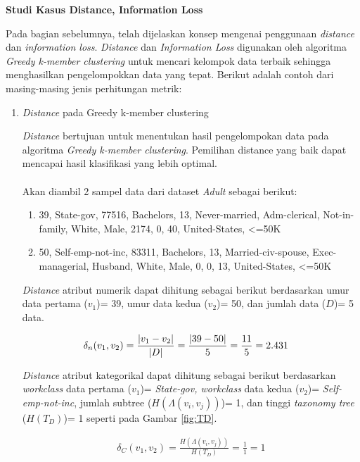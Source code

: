 \documentclass[a4paper,twoside]{article}
\begin{document}
\begin{enumerate}
\textbf{Studi Kasus Distance, Information Loss}

Pada bagian sebelumnya, telah dijelaskan konsep mengenai penggunaan \textit{distance} dan \textit{information loss}. \textit{Distance} dan \textit{Information Loss} digunakan oleh algoritma \textit{Greedy k-member clustering} untuk mencari kelompok data terbaik sehingga menghasilkan pengelompokkan data yang tepat. Berikut adalah contoh dari masing-masing jenis perhitungan metrik:

\begin{enumerate}

\item \textit{Distance} pada Greedy k-member clustering

\textit{Distance} bertujuan untuk menentukan hasil pengelompokan data pada algoritma \textit{Greedy k-member clustering}. Pemilihan distance yang baik dapat mencapai hasil klasifikasi yang lebih optimal.
\\\\
\noindent Akan diambil 2 sampel data dari dataset \textit{Adult} sebagai berikut:
\begin{enumerate}
\item 39, State-gov, 77516, Bachelors, 13, Never-married, Adm-clerical, Not-in-family, White, Male, 2174, 0, 40, United-States, <=50K
\item 50, Self-emp-not-inc, 83311, Bachelors, 13, Married-civ-spouse, Exec-managerial, Husband, White, Male, 0, 0, 13, United-States, <=50K
\end{enumerate}

\noindent \textit{Distance} atribut numerik dapat dihitung sebagai berikut berdasarkan umur data pertama ($v_1$)= 39, umur data kedua ($v_2$)= 50, dan jumlah data ($D$)= 5 data.


\begin{align*}
\delta_n(v_1,v_2) &= \frac{|v_1 - v_2|}{|D|}
= \frac{|39 - 50|}{5}\vspace{0.2cm}
= \frac{11}{5}\vspace{0.2cm}
= 2.431
\end{align*}

\noindent \textit{Distance} atribut kategorikal dapat dihitung sebagai berikut berdasarkan \textit{workclass} data pertama ($v_1$)= \textit{State-gov, workclass} data kedua ($v_2$)= \textit{Self-emp-not-inc}, jumlah subtree ($H(\Lambda(v_i,v_j))$)= 1, dan tinggi \textit{taxonomy tree} ($H(T_D)$)= 1  seperti pada Gambar \ref{fig:TD}.

\begin{align*}
\delta_C(v_1,v_2) = \frac{H(\Lambda(v_i,v_j))}{H(T_D)} 
= \frac{1}{1}
= 1
\end{align*}


\end{enumerate}
\end{enumerate}
\end{document}
